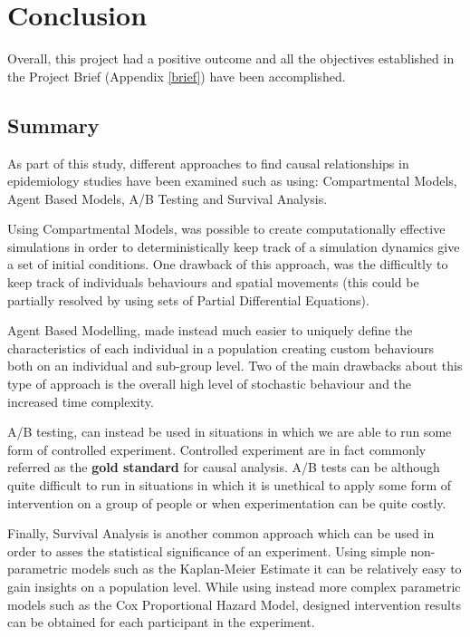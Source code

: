 \chapter{Conclusion}

\label{ch:planwork}
\setlength\lineskip{0pt}
\vspace*{15pt}

Overall, this project had a positive outcome and all the objectives established in the Project Brief (Appendix \ref{brief}) have been accomplished.

\section{Summary}
As part of this study, different approaches to find causal relationships in epidemiology studies have been examined such as using: Compartmental Models, Agent Based Models, A/B Testing and Survival Analysis.

Using Compartmental Models, was possible to create computationally effective simulations in order to deterministically keep track of a simulation dynamics give a set of initial conditions. One drawback of this approach, was the difficultly to keep track of individuals behaviours and spatial movements (this could be partially resolved by using sets of Partial Differential Equations).

Agent Based Modelling, made instead much easier to uniquely define the characteristics of each individual in a population creating custom behaviours both on an individual and sub-group level. Two of the main drawbacks about this type of approach is the overall high level of stochastic behaviour and the increased time complexity.

A/B testing, can instead be used in situations in which we are able to run some form of controlled experiment. Controlled experiment are in fact commonly referred as the \textbf{gold standard} for causal analysis. A/B tests can be although quite difficult to run in situations in which it is unethical to apply some form of intervention on a group of people or when experimentation can be quite costly.

Finally, Survival Analysis is another common approach which can be used in order to asses the statistical significance of an experiment. Using simple non-parametric models such as the Kaplan-Meier Estimate it can be relatively easy to gain insights on a population level. While using instead more complex parametric models such as the Cox Proportional Hazard  Model, designed intervention results can be obtained for each participant in the experiment.

